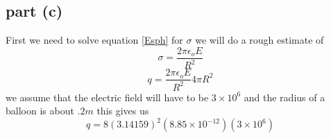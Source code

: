\documentclass[11pt]{article}
\numberwithin{equation}{section}
\begin{document}
\subsection{part (c)}
First we need to solve equation \ref{Esph} for $\sigma$ we will do a rough estimate of
$$\sigma = \frac{2\pi\epsilon_oE}{R^2}$$
$$q = \frac{2\pi\epsilon_oE}{R^2} 4\pi R^2$$
we assume that the electric field will have to be $3 \times 10^6$ and the radius of a balloon is about $.2 m$ this gives us
$$q = 8(3.14159)^2(8.85\times10^{-12})(3\times10^6)$$
\begin{center}
\end{center}
\end{document}
